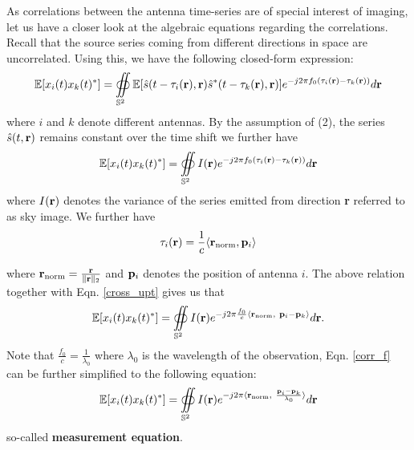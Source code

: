 \documentclass[aoas,preprint]{imsart}
\numberwithin{equation}{section}
\theoremstyle{plain}
\begin{document}
{As correlations between the antenna time-series are of special interest of imaging, let us have a closer look at the algebraic equations regarding the correlations. Recall that the source series coming from different directions in space are uncorrelated. Using this, we have the following closed-form expression:
 \begin{equation}
 \mathbb{E}[x_i(t)x_k(t)^*] = \oiint\displaylimits_{\mathbb{S}^2} \mathbb{E}[\hat{s}(t-\tau_i({\bf r}),{\bf r})\hat{s}^*(t-\tau_k({\bf r}),{\bf r})]e^{-j2\pi f_0 (\tau_i({\bf r})-\tau_k({\bf r}))}d{\bf r} \label{cross_corr}
 \end{equation}
 where $i$ and $k$ denote different antennas.
 By the assumption of (2), the series $\hat{s}(t,{\bf r})$ remains constant over the time shift we further have 
 \begin{equation}
 \mathbb{E}[x_i(t)x_k(t)^*] = \oiint\displaylimits_{\mathbb{S}^2} {I}({\bf r}) e^{-j2\pi f_0 (\tau_i({\bf r})-\tau_k({\bf r}))} d {\bf r} \label{cross_upt}
 \end{equation}
 where ${I}({\bf r})$ denotes the variance of the series emitted from direction {\bf r} referred to as sky image. We further have
\begin{equation}
\tau_{i}({\bf r}) = \frac{1}{c} \langle {\bf r}_{\text{norm}}, {\bf p}_i\rangle \label{tau}
\end{equation}

where ${\bf r}_{\text{norm}} = \frac{{\bf r}}{\| {\bf r}\|_2}$ and ${\bf{p}}_i$ denotes the position of antenna $i$.
The above relation together with Eqn. \ref{cross_upt} gives us that
\begin{equation}
 \mathbb{E}[x_i(t)x_k(t)^*] = \oiint\displaylimits_{\mathbb{S}^2} {I}({\bf r}) e^{-j2\pi \frac{f_0}{c} \langle {\bf r}_{\text{norm}},  \ {\bf p}_i -{\bf p}_k\rangle }d{\bf r}.\label{corr_f}
\end{equation}
Note that $\frac{f_0}{c} = \frac{1}{\lambda_0}$ where $\lambda_0$ is the wavelength of the observation, Eqn. \ref{corr_f} can be further simplified to the following equation:
\begin{equation}
 \mathbb{E}[x_i(t)x_k(t)^*] = \oiint\displaylimits_{\mathbb{S}^2} {I}({\bf r}) e^{-j2\pi \langle {\bf r}_{\text{norm}},  \ \frac{{\bf p}_i -{\bf p}_k}{\lambda_0}\rangle }d{\bf r}\label{corr_four}
\end{equation}
so-called {\bf measurement equation}.
\vspace{0.5em}

}
\end{document}
